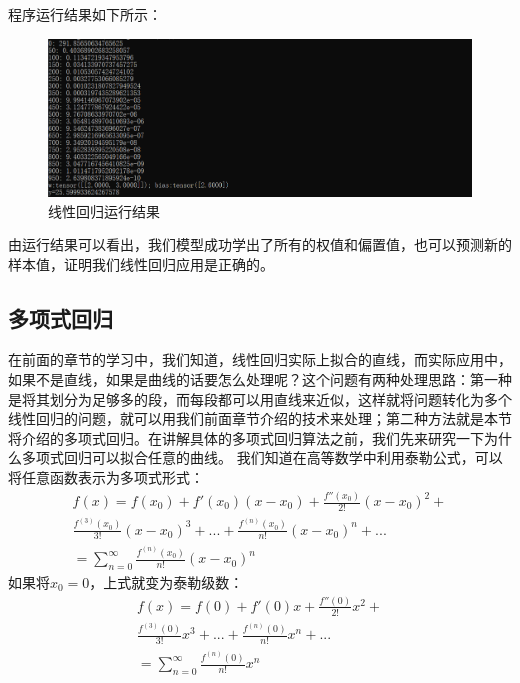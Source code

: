 \documentclass[UTF8]{article}
\begin{document}
程序运行结果如下所示：
\begin{figure}[H]
	\caption{线性回归运行结果}
	\label{f000015}
	\centering
	\includegraphics[width=15cm]{images/f000015}
\end{figure}
由运行结果可以看出，我们模型成功学出了所有的权值和偏置值，也可以预测新的样本值，证明我们线性回归应用是正确的。
\subsection{多项式回归}
在前面的章节的学习中，我们知道，线性回归实际上拟合的直线，而实际应用中，如果不是直线，如果是曲线的话要怎么处理呢？这个问题有两种处理思路：第一种是将其划分为足够多的段，而每段都可以用直线来近似，这样就将问题转化为多个线性回归的问题，就可以用我们前面章节介绍的技术来处理；第二种方法就是本节将介绍的多项式回归。在讲解具体的多项式回归算法之前，我们先来研究一下为什么多项式回归可以拟合任意的曲线。\newline
我们知道在高等数学中利用泰勒公式，可以将任意函数表示为多项式形式：
\begin{equation}
\begin{aligned}
f(x)=f(x_{0}) + f'(x_{0})(x-x_{0}) + \frac{f''(x_{0})}{2!}(x-x_{0})^{2} + \\
\frac{f^{(3)}(x_{0})}{3!}(x-x_{0})^{3} + ... + \frac{f^{(n)}(x_{0})}{n!}(x-x_{0})^{n} + ... \\
=\sum_{n=0}^{\infty} \frac{f^{(n)}(x_{0})}{n!} (x-x_{0})^{n}
\end{aligned}
\label{lrrn-taylor-formula}
\end{equation}
如果将$x_{0}=0$，上式就变为泰勒级数：
\begin{equation}
\begin{aligned}
f(x)=f(0) + f'(0)x + \frac{f''(0)}{2!}x^{2} + \\
\frac{f^{(3)}(0)}{3!}x^{3} + ... + \frac{f^{(n)}(0)}{n!}x^{n} + ... \\
=\sum_{n=0}^{\infty} \frac{f^{(n)}(0)}{n!} x^{n}
\end{aligned}
\label{lrrn-taylor-formula-x00}
\end{equation}
\end{document}
